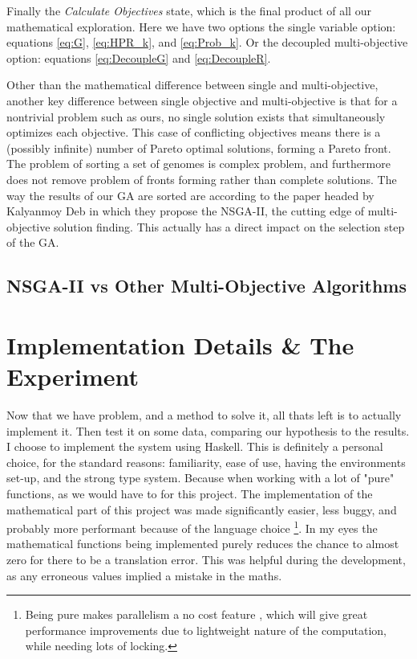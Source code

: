 \documentclass[11pt]{article}
\begin{document}
    Finally the \textit{Calculate Objectives} state, which is the final product of all our
    mathematical exploration. Here we have two options the single variable option: equations
    \ref{eq:G}, \ref{eq:HPR_k}, and \ref{eq:Prob_k}. Or the decoupled multi-objective
    option: equations \ref{eq:DecoupleG} and \ref{eq:DecoupleR}. 

    Other than the mathematical difference between single and multi-objective,
    another key difference between single objective and multi-objective is that for a
    nontrivial problem such as ours, no single solution exists that simultaneously
    optimizes each objective. This case of conflicting objectives means there is
    a (possibly infinite) number of Pareto optimal solutions, forming a Pareto front.
    The problem of sorting a set of genomes is complex problem, and furthermore
    does not remove problem of fronts forming rather than complete solutions.
    The way the results of our GA are sorted are according to the paper headed by
    Kalyanmoy Deb \cite{DebPratapAgarwalMeyarivan} in which they propose the
    NSGA-II, the cutting edge of multi-objective solution finding. This actually
    has a direct impact on the selection step of the GA.

\subsection{NSGA-II vs Other Multi-Objective Algorithms}



\section{Implementation Details \& The Experiment}

    Now that we have problem, and a method to solve it, all thats left is to actually
    implement it. Then test it on some data, comparing our hypothesis to the results.
    I choose to implement the system using Haskell. This is definitely a personal
    choice, for the standard reasons: familiarity, ease of use, having the environments
    set-up, and the strong type system. Because when working with a lot of "pure"
    functions, as we would have to for this project. The implementation 
    of the mathematical part of this project was made significantly
    easier, less buggy, and probably more performant because of the language choice
    \footnote{Being pure makes parallelism a no cost feature \cite{HarrisMarlowJones, Chakravarty}, 
    which will give great performance improvements due to lightweight nature of the 
    computation, while needing lots of locking. }.
    In my eyes the mathematical functions
    being implemented purely reduces the chance to almost zero for there to be a translation
    error. This was helpful during the development, as any erroneous values implied a mistake
    in the maths.
\end{document}
